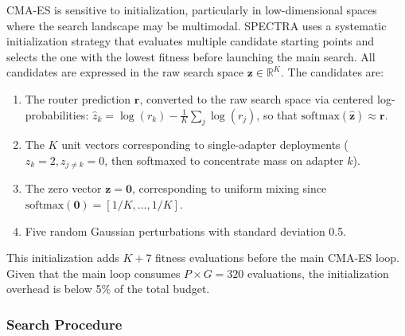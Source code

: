 \documentclass[preprint,12pt]{elsarticle}
\begin{document}
CMA-ES is sensitive to initialization, particularly in low-dimensional spaces
where the search landscape may be multimodal. SPECTRA uses a systematic
initialization strategy that evaluates multiple candidate starting points and
selects the one with the lowest fitness before launching the main search.
All candidates are expressed in the raw search space $\mathbf{z} \in \mathbb{R}^K$.
The candidates are:
\begin{enumerate}
    \item The router prediction $\mathbf{r}$, converted to the raw search
    space via centered log-probabilities:
    $\hat{z}_k = \log(r_k) - \frac{1}{K}\sum_j \log(r_j)$,
    so that $\mathrm{softmax}(\hat{\mathbf{z}}) \approx \mathbf{r}$.
    \item The $K$ unit vectors corresponding to single-adapter deployments
    ($z_k = 2, z_{j \neq k} = 0$, then softmaxed to concentrate mass on
    adapter $k$).
    \item The zero vector $\mathbf{z} = \mathbf{0}$, corresponding to uniform
    mixing since $\mathrm{softmax}(\mathbf{0}) = [1/K, \ldots, 1/K]$.
    \item Five random Gaussian perturbations with standard deviation 0.5.
\end{enumerate}

This initialization adds $K + 7$ fitness evaluations before the main CMA-ES
loop. Given that the main loop consumes $P \times G = 320$ evaluations, the
initialization overhead is below 5\% of the total budget.

\subsubsection{Search Procedure}
\end{document}
